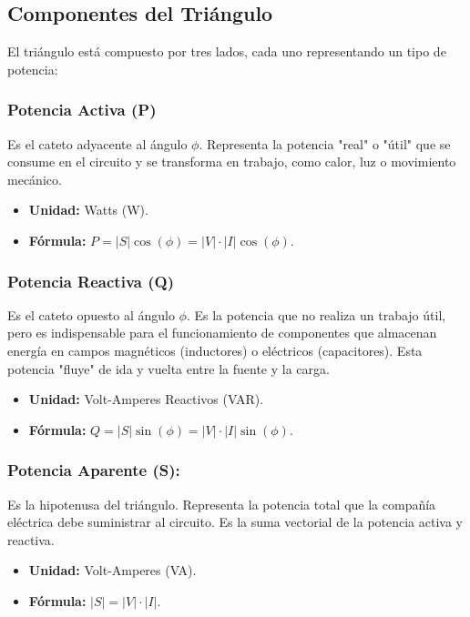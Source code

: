 \documentclass[12pt, letterpaper]{article}
\begin{document}
\subsection*{Componentes del Triángulo}

El triángulo está compuesto por tres lados, cada uno representando un tipo de potencia:


\subsubsection*{Potencia Activa (P)}

Es el cateto adyacente al ángulo $\phi$. Representa la potencia "real" o "útil" que se consume en el circuito y se transforma en trabajo, como calor, luz o movimiento mecánico.

\begin{itemize}
	\item \textbf{Unidad:} Watts (W).
	\item \textbf{Fórmula:} \( P = |S| \cos(\phi) = |V| \cdot |I| \cos(\phi) \).
\end{itemize}

\subsubsection*{Potencia Reactiva (Q)}

Es el cateto opuesto al ángulo $\phi$. Es la potencia que no realiza un trabajo útil, pero es indispensable para el funcionamiento de componentes que almacenan energía en campos magnéticos (inductores) o eléctricos (capacitores). Esta potencia "fluye" de ida y vuelta entre la fuente y la carga.

\begin{itemize}
	\item \textbf{Unidad:} Volt-Amperes Reactivos (VAR).
	\item \textbf{Fórmula:} \( Q = |S| \sin(\phi) = |V| \cdot |I| \sin(\phi) \).
\end{itemize}

\subsubsection*{Potencia Aparente (S):}

Es la hipotenusa del triángulo. Representa la potencia total que la compañía eléctrica debe suministrar al circuito. Es la suma vectorial de la potencia activa y reactiva.

\begin{itemize}
	\item \textbf{Unidad:} Volt-Amperes (VA).
	\item \textbf{Fórmula:} \( |S| = |V| \cdot |I| \).
\end{itemize}
\end{document}
